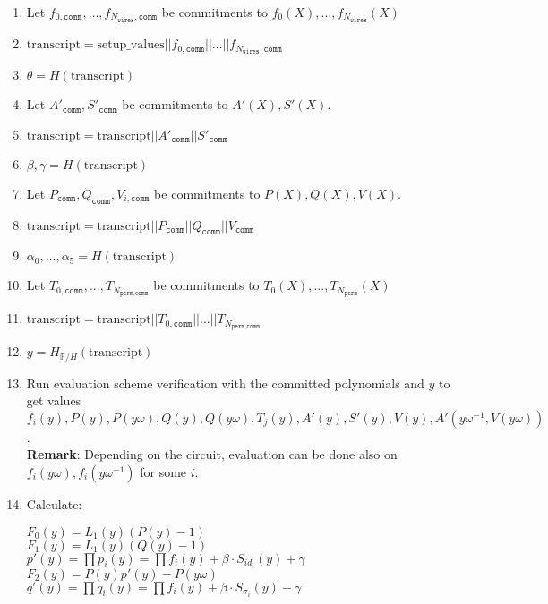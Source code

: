 \begin{enumerate}
	\item Let $f_{0, \texttt{comm}}, \dots, f_{N_{\texttt{wires}}, \texttt{comm}}$ be commitments to $f_{0}(X), \dots, f_{N_{\texttt{wires}}}(X)$
	\item $\text{transcript} = \text{setup\_values} || f_{0, \texttt{comm}} || \dots || f_{N_{\texttt{wires}}, \texttt{comm}}$
	\item $\theta= H(\text{transcript})$
	\item Let $A'_{\texttt{comm}}, S'_{\texttt{comm}}$ be commitments to $A'(X), S'(X)$.
	\item $\text{transcript} = \text{transcript} || A'_{\texttt{comm}} || S'_{\texttt{comm}}$ 
	\item $\beta, \gamma = H(\text{transcript})$
	\item Let $P_{\texttt{comm}}, Q_{\texttt{comm}}, V_{i, \texttt{comm}}$ be commitments to $P(X), Q(X), V(X)$.
	\item $\text{transcript} = \text{transcript} || P_{\texttt{comm}} || Q_{\texttt{comm}} || V_{\texttt{comm}}$
	\item $\alpha_0, \dots, \alpha_5 = H(\text{transcript})$
	\item Let $T_{0, \texttt{comm}}, ..., T_{N_{\texttt{perm}, \texttt{comm}}}$ be commitments to $T_0(X), ..., T_{N_{\texttt{perm}}}(X)$ 
	\item $\text{transcript} = \text{transcript} || T_{0, \texttt{comm}} || ... || T_{N_{\texttt{perm}, \texttt{comm}}}$
	\item $y = H_{\mathbb{F}/H}(\text{transcript})$
	\item Run evaluation scheme verification with the committed polynomials and $y$ to get values 
		$f_i(y), P(y), P(y\omega), Q(y), Q(y\omega), T_j(y), A'(y), S'(y), V(y), A'(y\omega^{-1}, V(y\omega))$.  \\
		\textbf{Remark}: Depending on the circuit, evaluation can be done also on $f_i(y\omega), f_i(y\omega^{-1})$ for some $i$.
	\item Calculate:
	\begin{center}
		$F_0(y) = L_1(y)(P(y) - 1)$ \\
		$F_1(y) = L_1(y)(Q(y) - 1)$ \\
		$p'(y) = \prod p_i(y) = \prod f_i(y) + \beta \cdot S_{id_i}(y) + \gamma$ \\
		$F_2(y) = P(y)p'(y) - P(y\omega)$ \\
		$q'(y) = \prod q_i(y) = \prod f_i(y) + \beta \cdot S_{\sigma_i}(y) + \gamma$ \\

\end{center}
\end{enumerate}

